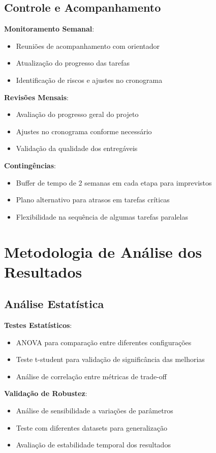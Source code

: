 \subsection{Controle e Acompanhamento}

\textbf{Monitoramento Semanal}:
\begin{itemize}
\item Reuniões de acompanhamento com orientador
\item Atualização do progresso das tarefas
\item Identificação de riscos e ajustes no cronograma
\end{itemize}

\textbf{Revisões Mensais}:
\begin{itemize}
\item Avaliação do progresso geral do projeto
\item Ajustes no cronograma conforme necessário
\item Validação da qualidade dos entregáveis
\end{itemize}

\textbf{Contingências}:
\begin{itemize}
\item Buffer de tempo de 2 semanas em cada etapa para imprevistos
\item Plano alternativo para atrasos em tarefas críticas
\item Flexibilidade na sequência de algumas tarefas paralelas
\end{itemize}

\section{Metodologia de Análise dos Resultados}

\subsection{Análise Estatística}

\textbf{Testes Estatísticos}:
\begin{itemize}
\item ANOVA para comparação entre diferentes configurações
\item Teste t-student para validação de significância das melhorias
\item Análise de correlação entre métricas de trade-off
\end{itemize}

\textbf{Validação de Robustez}:
\begin{itemize}
\item Análise de sensibilidade a variações de parâmetros
\item Teste com diferentes datasets para generalização
\item Avaliação de estabilidade temporal dos resultados
\end{itemize}

